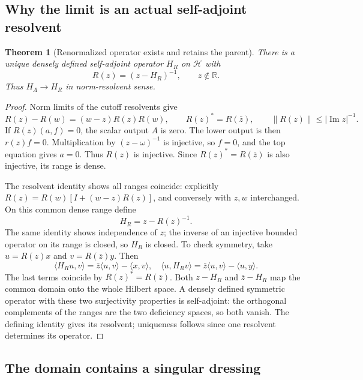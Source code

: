 \documentclass[11pt]{article}
\newtheorem{theorem}{Theorem}[section]
\theoremstyle{remark}
\begin{document}
\subsection{Why the limit is an actual self-adjoint resolvent}

\begin{theorem}[Renormalized operator exists and retains the parent]
\label{thm:v20v47-operator}
There is a unique densely defined self-adjoint operator \(H_R\) on
\(\mathcal H\) with
\[
 R(z)=(z-H_R)^{-1},\qquad z\notin\mathbb R.
\]
Thus \(H_\Lambda\to H_R\) in norm-resolvent sense.
\end{theorem}
\begin{proof}
Norm limits of the cutoff resolvents give
\[
 R(z)-R(w)=(w-z)R(z)R(w),\qquad
 R(z)^*=R(\bar z),\qquad
 \|R(z)\|\leq|\operatorname{Im}z|^{-1}.
\]
If \(R(z)(a,f)=0\), the scalar output \(A\) is zero.
The lower output is then \(r(z)f=0\).  Multiplication by
\((z-\omega)^{-1}\) is injective, so \(f=0\), and the top equation
gives \(a=0\).  Thus \(R(z)\) is injective.
Since \(R(z)^*=R(\bar z)\) is also injective, its range is dense.

The resolvent identity shows all ranges coincide: explicitly
\(R(z)=R(w)[I+(w-z)R(z)]\), and conversely with \(z,w\)
interchanged.  On this common dense range define
\[
 H_R=z-R(z)^{-1}.
\]
The same identity shows independence of \(z\); the inverse of an
injective bounded operator on its range is closed, so \(H_R\)
is closed.  To check symmetry, take \(u=R(z)x\) and
\(v=R(\bar z)y\).  Then
\[
 \langle H_Ru,v\rangle
 =\bar z\langle u,v\rangle-\langle x,v\rangle,\quad
 \langle u,H_Rv\rangle
 =\bar z\langle u,v\rangle-\langle u,y\rangle.
\]
The last terms coincide by \(R(z)^*=R(\bar z)\).
Both \(z-H_R\) and \(\bar z-H_R\) map the common domain onto
the whole Hilbert space.  A densely defined symmetric operator
with these two surjectivity properties is self-adjoint:
the orthogonal complements of the ranges are the two deficiency
spaces, so both vanish.  The defining identity gives its resolvent;
uniqueness follows since one resolvent determines its operator.
\end{proof}

\subsection{The domain contains a singular dressing}
\end{document}
